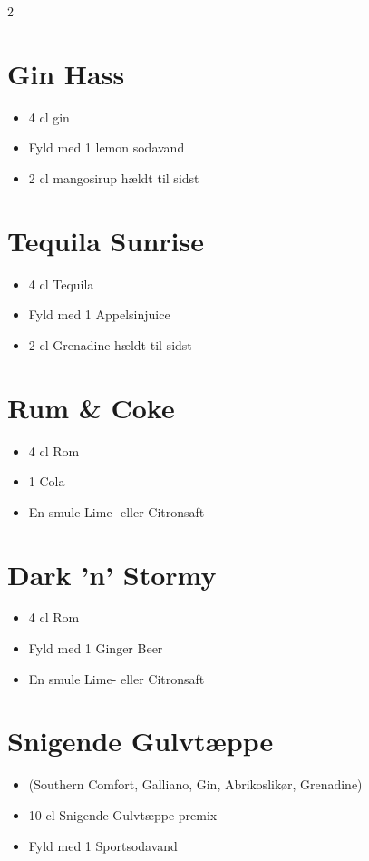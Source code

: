 \documentclass[a4paper,12pt]{article}
\begin{document}
\begin{multicols}{2}
\section*{Gin Hass}
\begin{itemize}
    \item 4 cl gin
    \item Fyld med 1 lemon sodavand
    \item 2 cl mangosirup hældt til sidst
\end{itemize}

\section*{Tequila Sunrise}
\begin{itemize}
    \item 4 cl Tequila
    \item Fyld med 1 Appelsinjuice
    \item 2 cl Grenadine hældt til sidst
\end{itemize}

\section*{Rum \& Coke}
\begin{itemize}
    \item 4 cl Rom
    \item 1 Cola
    \item En smule Lime- eller Citronsaft
\end{itemize}

\section*{Dark 'n' Stormy}
\begin{itemize}
    \item 4 cl Rom
    \item Fyld med 1 Ginger Beer
    \item En smule Lime- eller Citronsaft
\end{itemize}

\section*{Snigende Gulvtæppe}
\begin{itemize}
    \item (Southern Comfort, Galliano, Gin, Abrikoslikør, Grenadine)
    \item 10 cl Snigende Gulvtæppe premix
    \item Fyld med 1 Sportsodavand
\end{itemize}


\end{multicols}
\end{document}
